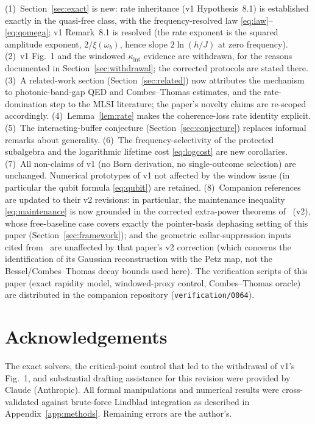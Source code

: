 \documentclass[11pt,a4paper]{article}
\theoremstyle{remark}
\begin{document}
(1)~Section~\ref{sec:exact} is new: rate inheritance (v1 Hypothesis~8.1) is established
exactly in the quasi-free class, with the frequency-resolved law
\eqref{eq:law}--\eqref{eq:qomega}; v1 Remark~8.1 is resolved (the rate exponent is the
squared amplitude exponent, $2/\xi(\omega_b)$, hence slope $2\ln(h/J)$ at zero
frequency). (2)~v1 Fig.~1 and the windowed $\kappa_{\mathrm{int}}$ evidence are
withdrawn, for the reasons documented in Section~\ref{sec:withdrawal}; the corrected
protocols are stated there. (3)~A related-work section
(Section~\ref{sec:related}) now attributes the mechanism to photonic-band-gap QED and
Combes--Thomas estimates, and the rate-domination step to the MLSI literature; the
paper's novelty claims are re-scoped accordingly. (4)~Lemma~\ref{lem:rate} makes the
coherence-loss rate identity explicit. (5)~The interacting-buffer conjecture
(Section~\ref{sec:conjecture}) replaces informal remarks about generality. (6)~The
frequency-selectivity of the protected subalgebra and the logarithmic lifetime cost
\eqref{eq:logcost} are new corollaries. (7)~All non-claims of v1 (no Born derivation, no
single-outcome selection) are unchanged. Numerical prototypes of v1 not affected by the
window issue (in particular the qubit formula \eqref{eq:qubit}) are retained.
(8)~Companion references are updated to their v2 revisions: in
particular, the maintenance inequality \eqref{eq:maintenance} is now grounded in the
corrected extra-power theorems of~\cite{Eriksson0061} (v2), whose free-baseline case
covers exactly the pointer-basis dephasing setting of this paper
(Section~\ref{sec:framework}); and the geometric collar-suppression inputs cited
from~\cite{Eriksson0060} are unaffected by that paper's v2 correction (which concerns
the identification of its Gaussian reconstruction with the Petz map, not the
Bessel/Combes--Thomas decay bounds used here). The verification scripts of this paper
(exact rapidity model, windowed-proxy control, Combes--Thomas oracle) are distributed in
the companion repository (\texttt{verification/0064}).

\section*{Acknowledgements}
The exact solvers, the critical-point control that led to the withdrawal of v1's Fig.~1,
and substantial drafting assistance for this revision were provided by Claude
(Anthropic). All formal manipulations and numerical results were cross-validated against
brute-force Lindblad integration as described in Appendix~\ref{app:methods}. Remaining
errors are the author's.
\end{document}
